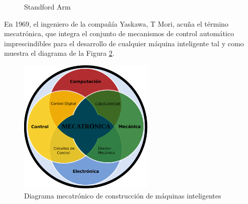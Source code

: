   \begin{figure}[H]
    \begin{center}
      \subcapcentertrue
      \hspace{2mm}
    \end{center}
    \caption{Standford Arm}
    \label{fig:standford_arm}
  \end{figure}
 
En 1969, el ingeniero de la compañía Yaskawa, T Mori, acuña el término mecatrónica, que integra el conjunto de mecanismos de control automático imprescindibles para el desarrollo de cualquier máquina inteligente \cite{Sanchez07b} tal y como muestra el diagrama de la Figura \ref{fig:Mecatrónica}.
  
  \begin{figure} [h!]
    \begin{center}
      \includegraphics[width=65mm]{figs/meca.png}
    \end{center}
    \caption{Diagrama mecatrónico de construcción de máquinas inteligentes}
    \label{fig:Mecatrónica}
  \end{figure}
  
